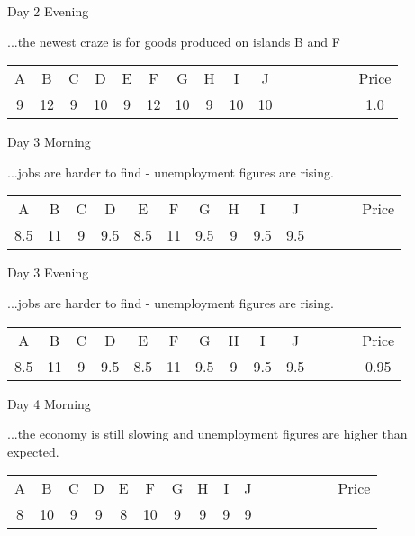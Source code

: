 \documentclass[notes=show]{beamer}
\begin{document}
\begin{frame}{Day 2 Evening}

\qquad ...the newest craze is for goods produced on islands B and F

\bigskip

\begin{center}
\begin{tabular}{cccccccccccccccc}
A & B & C & D & E & F & G & H & I & J &  &  &  &  &  & Price \\ 
9 & 12 & 9 & 10 & 9 & 12 & 10 & 9 & 10 & 10 &  &  &  &  &  & 1.0%
\end{tabular}
\end{center}
\end{frame}%

\begin{frame}{Day 3 Morning}

\qquad ...jobs are harder to find - unemployment figures are rising.\ 

\bigskip

\begin{center}
\begin{tabular}{cccccccccccccc}
A & B & C & D & E & F & G & H & I & J &  &  &  & Price \\ 
8.5 & 11 & 9 & 9.5 & 8.5 & 11 & 9.5 & 9 & 9.5 & 9.5 &  &  &  & 
\end{tabular}
\end{center}
\end{frame}%


\begin{frame}{Day 3 Evening}

\qquad ...jobs are harder to find - unemployment figures are rising.\ 

\bigskip

\begin{center}
\begin{tabular}{cccccccccccccc}
A & B & C & D & E & F & G & H & I & J &  &  &  & Price \\ 
8.5 & 11 & 9 & 9.5 & 8.5 & 11 & 9.5 & 9 & 9.5 & 9.5 &  &  &  & 0.95%
\end{tabular}
\end{center}
\end{frame}%


\begin{frame}{Day 4 Morning}

\qquad ...the economy is still slowing and unemployment figures are
higher than expected.

\bigskip

\begin{center}
\begin{tabular}{cccccccccccccccc}
A & B & C & D & E & F & G & H & I & J &  &  &  &  &  & Price \\ 
8 & 10 & 9 & 9 & 8 & 10 & 9 & 9 & 9 & 9 &  &  &  &  &  & 
\end{tabular}
\end{center}
\end{frame}
\end{document}
